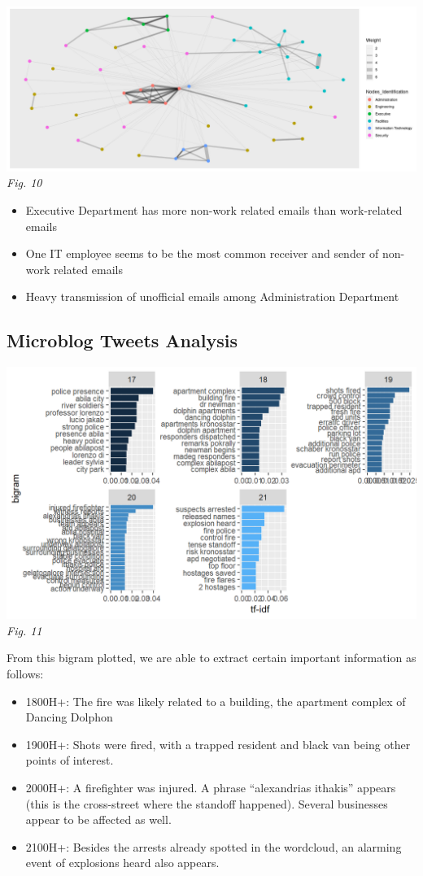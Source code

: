 \documentclass{acm_proc_article-sp}
\providecommand{\tightlist}{%
  \setlength{\itemsep}{0pt}\setlength{\parskip}{0pt}}
\begin{document}
\includegraphics{img/image15.png} \emph{Fig. 10}

\begin{itemize}
\tightlist
\item
  Executive Department has more non-work related emails than
  work-related emails
\item
  One IT employee seems to be the most common receiver and sender of
  non-work related emails
\item
  Heavy transmission of unofficial emails among Administration
  Department
\end{itemize}

\hypertarget{microblog-tweets-analysis}{%
\subsection{Microblog Tweets Analysis}\label{microblog-tweets-analysis}}

\includegraphics{img/image08.png} \emph{Fig. 11}

From this bigram plotted, we are able to extract certain important
information as follows:

\begin{itemize}
\tightlist
\item
  1800H+: The fire was likely related to a building, the apartment
  complex of Dancing Dolphon
\item
  1900H+: Shots were fired, with a trapped resident and black van being
  other points of interest.
\item
  2000H+: A firefighter was injured. A phrase ``alexandrias ithakis''
  appears (this is the cross-street where the standoff happened).
  Several businesses appear to be affected as well.
\item
  2100H+: Besides the arrests already spotted in the wordcloud, an
  alarming event of explosions heard also appears.
\end{itemize}
\end{document}
